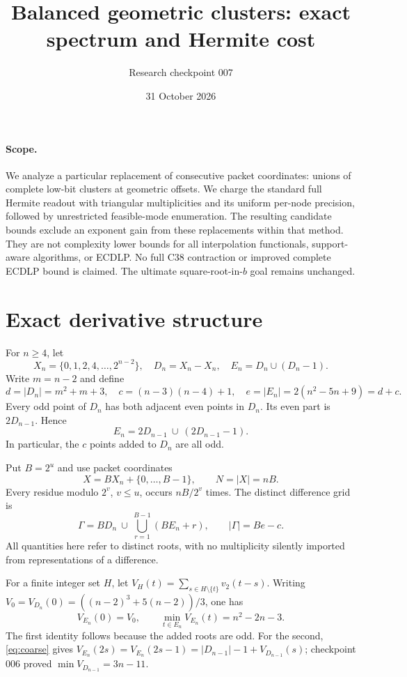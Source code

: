\documentclass[11pt]{article}
\title{Balanced geometric clusters: exact spectrum and Hermite cost}
\author{Research checkpoint 007}
\date{31 October 2026}
\begin{document}
\maketitle

\paragraph{Scope.}
We analyze a particular replacement of consecutive packet coordinates:
unions of complete low-bit clusters at geometric offsets. We charge the
standard full Hermite readout with triangular multiplicities and its
uniform per-node precision, followed by unrestricted feasible-mode
enumeration. The resulting candidate bounds exclude an exponent gain
from these replacements within that method. They are not complexity
lower bounds for all interpolation functionals, support-aware algorithms,
or ECDLP. No full C38 contraction or improved complete ECDLP bound is
claimed. The ultimate square-root-in-$b$ goal remains unchanged.

\section{Exact derivative structure}
For $n\ge4$, let
\[
 X_n=\{0,1,2,4,\ldots,2^{n-2}\},\quad D_n=X_n-X_n,
 \quad E_n=D_n\cup(D_n-1).
\]
Write $m=n-2$ and define
\[
 d=|D_n|=m^2+m+3,\quad
 c=(n-3)(n-4)+1,\quad
 e=|E_n|=2(n^2-5n+9)=d+c.
\]
Every odd point of $D_n$ has both adjacent even points in $D_n$.
Its even part is $2D_{n-1}$. Hence
\begin{equation}
 E_n=2D_{n-1}\ \cup\ (2D_{n-1}-1).
 \label{eq:coarse}
\end{equation}
In particular, the $c$ points added to $D_n$ are all odd.

Put $B=2^u$ and use packet coordinates
\[
 X=B X_n+\{0,\ldots,B-1\},\qquad N=|X|=nB.
\]
Every residue modulo $2^v$, $v\le u$, occurs $nB/2^v$ times.
The distinct difference grid is
\begin{equation}
 \Gamma=BD_n\ \cup\ \bigcup_{r=1}^{B-1}(BE_n+r),
 \qquad |\Gamma|=Be-c.
 \label{eq:grid}
\end{equation}
All quantities here refer to distinct roots, with no multiplicity
silently imported from representations of a difference.

For a finite integer set $H$, let
$V_H(t)=\sum_{s\in H\setminus\{t\}}v_2(t-s)$.
Writing $V_0=V_{D_n}(0)=((n-2)^3+5(n-2))/3$, one has
\[
 V_{E_n}(0)=V_0,\qquad
 \min_{t\in E_n}V_{E_n}(t)=n^2-2n-3.
\]
The first identity follows because the added roots are odd. For the
second, \eqref{eq:coarse} gives
$V_{E_n}(2s)=V_{E_n}(2s-1)=|D_{n-1}|-1+V_{D_{n-1}}(s)$;
checkpoint 006 proved $\min V_{D_{n-1}}=3n-11$.
\end{document}
